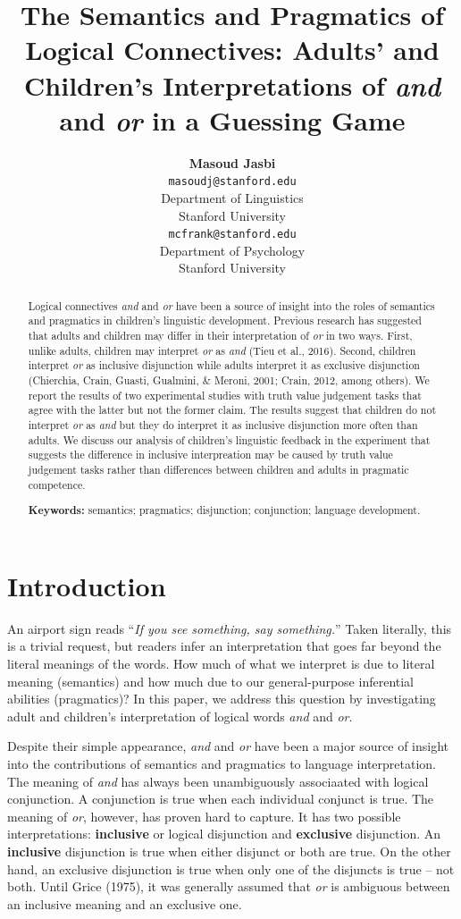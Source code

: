 \documentclass[10pt, letterpaper]{article}
\title{The Semantics and Pragmatics of Logical Connectives: Adults' and
Children's Interpretations of \emph{and} and \emph{or} in a Guessing
Game}
\author{{\large \bf Masoud Jasbi} \\ \texttt{masoudj@stanford.edu} \\ Department of Linguistics \\ Stanford University \And {\large \bf Michael C. Frank} \\ \texttt{mcfrank@stanford.edu} \\ Department of Psychology \\ Stanford University}
\begin{document}
\maketitle

\begin{abstract}
Logical connectives \emph{and} and \emph{or} have been a source of
insight into the roles of semantics and pragmatics in children's
linguistic development. Previous research has suggested that adults and
children may differ in their interpretation of \emph{or} in two ways.
First, unlike adults, children may interpret \emph{or} as \emph{and}
(Tieu et al., 2016). Second, children interpret \emph{or} as inclusive
disjunction while adults interpret it as exclusive disjunction
(Chierchia, Crain, Guasti, Gualmini, \& Meroni, 2001; Crain, 2012, among
others). We report the results of two experimental studies with truth
value judgement tasks that agree with the latter but not the former
claim. The results suggest that children do not interpret \emph{or} as
\emph{and} but they do interpret it as inclusive disjunction more often
than adults. We discuss our analysis of children's linguistic feedback
in the experiment that suggests the difference in inclusive
interpreation may be caused by truth value judgement tasks rather than
differences between children and adults in pragmatic competence.

\textbf{Keywords:}
semantics; pragmatics; disjunction; conjunction; language development.
\end{abstract}

\section{Introduction}\label{introduction}

An airport sign reads ``\emph{If you see something, say something.}''
Taken literally, this is a trivial request, but readers infer an
interpretation that goes far beyond the literal meanings of the words.
How much of what we interpret is due to literal meaning (semantics) and
how much due to our general-purpose inferential abilities (pragmatics)?
In this paper, we address this question by investigating adult and
children's interpretation of logical words \emph{and} and \emph{or}.

Despite their simple appearance, \emph{and} and \emph{or} have been a
major source of insight into the contributions of semantics and
pragmatics to language interpretation. The meaning of \emph{and} has
always been unambiguously associaated with logical conjunction. A
conjunction is true when each individual conjunct is true. The meaning
of \emph{or}, however, has proven hard to capture. It has two possible
interpretations: \textbf{inclusive} or logical disjunction and
\textbf{exclusive} disjunction. An \textbf{inclusive} disjunction is
true when either disjunct or both are true. On the other hand, an
exclusive disjunction is true when only one of the disjuncts is true --
not both. Until Grice (1975), it was generally assumed that \emph{or} is
ambiguous between an inclusive meaning and an exclusive one.
\end{document}
